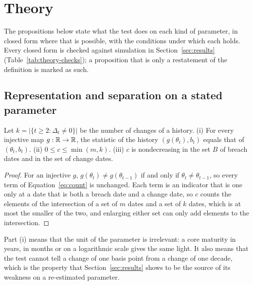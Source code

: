 \section{Theory}
\label{sec:theory}

The propositions below state what the test does on each kind of parameter, in closed form where that is possible, with the conditions under which each holds. Every closed form is checked against simulation in Section~\ref{sec:results} (Table~\ref{tab:theory-checks}); a proposition that is only a restatement of the definition is marked as such.

\subsection{Representation and separation on a stated parameter}
\label{sec:theory-basic}

\begin{proposition}[Representation]
\label{prop:exact}
Let $k=|\{t\ge 2:\Delta_t\ne 0\}|$ be the number of changes of a history. (i) For every injective map $g:\mathbb{R}\to\mathbb{R}$, the statistic of the history $(g(\theta_t),b_t)$ equals that of $(\theta_t,b_t)$. (ii) $0\le c\le\min(m,k)$. (iii) $c$ is nondecreasing in the set $B$ of breach dates and in the set of change dates.
\end{proposition}
\begin{proof}
For an injective $g$, $g(\theta_t)\ne g(\theta_{t-1})$ if and only if $\theta_t\ne\theta_{t-1}$, so every term of Equation~\eqref{eq:count} is unchanged. Each term is an indicator that is one only at a date that is both a breach date and a change date, so $c$ counts the elements of the intersection of a set of $m$ dates and a set of $k$ dates, which is at most the smaller of the two, and enlarging either set can only add elements to the intersection.
\end{proof}
Part (i) means that the unit of the parameter is irrelevant: a core maturity in years, in months or on a logarithmic scale gives the same light. It also means that the test cannot tell a change of one basis point from a change of one decade, which is the property that Section~\ref{sec:results} shows to be the source of its weakness on a re-estimated parameter.

